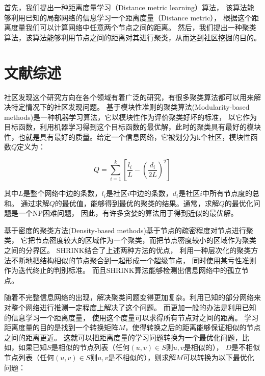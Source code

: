 首先，我们提出一种距离度量学习（Distance metric learning）算法，
该算法能够利用已知的局部网络的信息学习一个距离度量（Distance metric），
根据这个距离度量我们可以计算网络中任意两个节点之间的距离。
然后，我们提出一种聚类算法，该算法能够利用节点之间的距离对其进行聚类，从而达到社区挖掘的目的。

\section{文献综述}

社区发现这个研究方向在各个领域有着广泛的研究，有很多聚类算法都可以用来解决特定情况下的社区发现问题。
基于模块性准则的聚类算法(Modularity-based methods)是一种机器学习算法，它以模块性作为评价聚类好坏的标准，
以它作为目标函数，利用机器学习得到这个目标函数的最优解，此时的聚类具有最好的模块性，也就是具有最好的质量。给定一个信息网络，它被划分为k个社区，模块性函数$Q$定义为：

\begin{equation}
Q = \sum_{i=1}^{k}[ \frac{l_i}{L} - (\frac{d_i}{2L})^2]
\end{equation}

其中$L$是整个网络中边的条数，$l_i$是社区$i$中边的条数，$d_i$是社区$i$中所有节点度的总和。
通过求解$Q$的最优值，能够得到最优的聚类的结果。通常，求解$Q$的最优化问题是一个NP困难问题，
因此，有许多贪婪的算法用于得到近似的最优解。

基于密度的聚类方法(Density-based methods)基于节点的疏密程度对节点进行聚类，
它把节点密度较大的区域作为一个聚类，而把节点密度较小的区域作为聚类之间的分界区。
SHRINK结合了上述两种方法的优点，
利用一种层次化的聚类方法不断地把结构相似的节点聚合到一起形成一个超级节点，
同时使用某亏性准则作为迭代终止的判别标准。
而且SHRINK算法能够检测出信息网络中的孤立节点。

随着不完整信息网络的出现，解决聚类问题变得更加复杂。利用已知的部分网络来对整个网络进行推测一定程度上解决了这个问题。
而更加一般的办法是利用已知的信息学习一个距离度量，
使用这个度量可以求得所有节点对之间的距离。
学习距离度量的目的是找到一个转换矩阵$M$，使得转换之后的距离能够保证相似的节点之间的距离更近。
这就可以把距离度量的学习问题转换为一个最优化问题，比如，如果已知$S$是相似的节点列表（任何$(u, v) \in S$则$u, v$是相似的），
$D$是不相似节点列表（任何$(u, v) \in S$则$u, v$是不相似的），则求解$M$可以转换为以下最优化问题：


